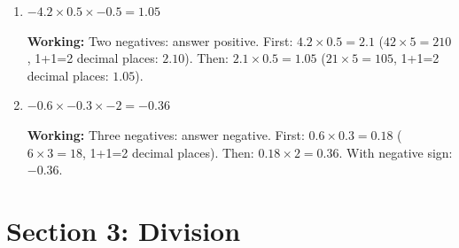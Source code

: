\documentclass[12pt,a4paper]{article}
\begin{document}
\begin{enumerate}
    \textbf{Working:} $34 \times 687 = 23358$ (calculate: $34 \times 600 = 20400$, $34 \times 87 = 2958$, total $23358$).
    4 decimal places + 1 decimal place = 5 decimal places: $0.23358$.
    
    \item $-4.2 \times 0.5 \times -0.5 = 1.05$
    
    \textbf{Working:} Two negatives: answer positive.
    First: $4.2 \times 0.5 = 2.1$ ($42 \times 5 = 210$, 1+1=2 decimal places: $2.10$).
    Then: $2.1 \times 0.5 = 1.05$ ($21 \times 5 = 105$, 1+1=2 decimal places: $1.05$).
    
    \item $-0.6 \times -0.3 \times -2 = -0.36$
    
    \textbf{Working:} Three negatives: answer negative.
    First: $0.6 \times 0.3 = 0.18$ ($6 \times 3 = 18$, 1+1=2 decimal places).
    Then: $0.18 \times 2 = 0.36$.
    With negative sign: $-0.36$.
\end{enumerate}

\newpage

\section*{Section 3: Division}
\end{document}
